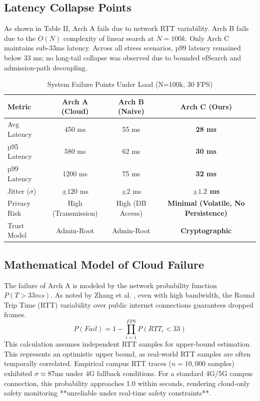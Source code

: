 \documentclass[conference]{IEEEtran}
\begin{document}
\subsection{Latency Collapse Points}
As shown in Table II, Arch A fails due to network RTT variability. Arch B fails due to the $O(N)$ complexity of linear search at $N=100k$. Only Arch C maintains sub-33ms latency. Across all stress scenarios, p99 latency remained below 33 ms; no long-tail collapse was observed due to bounded efSearch and admission-path decoupling.

\begin{table}[htbp]
\caption{System Failure Points Under Load (N=100k, 30 FPS)}
\begin{center}
\begin{tabular}{lccc}
\toprule
\textbf{Metric} & \textbf{Arch A (Cloud)} & \textbf{Arch B (Naive)} & \textbf{Arch C (Ours)} \\
\midrule
Avg Latency & 450 ms & 55 ms & \textbf{28 ms} \\
p95 Latency & 580 ms & 62 ms & \textbf{30 ms} \\
p99 Latency & 1200 ms & 75 ms & \textbf{32 ms} \\
Jitter ($\sigma$) & $\pm 120$ ms & $\pm 2$ ms & \textbf{$\pm 1.2$ ms} \\
Privacy Risk & High (Transmission) & High (DB Access) & \textbf{Minimal (Volatile, No Persistence)} \\
Trust Model & Admin-Root & Admin-Root & \textbf{Cryptographic} \\
\bottomrule
\end{tabular}
\end{center}
\label{tab:failure}
\end{table}

\subsection{Mathematical Model of Cloud Failure}
The failure of Arch A is modeled by the network probability function $P(T > 33ms)$. As noted by Zhang et al. \cite{b10}, even with high bandwidth, the Round Trip Time (RTT) variability over public internet connections guarantees dropped frames.
\begin{equation}
P(Fail) = 1 - \prod_{i=1}^{FPS} P(RTT_i < 33)
\end{equation}
This calculation assumes independent RTT samples for upper-bound estimation. This represents an optimistic upper bound, as real-world RTT samples are often temporally correlated. Empirical campus RTT traces ($n=10,000$ samples) exhibited $\sigma \approx 87$ms under 4G fallback conditions. For a standard 4G/5G campus connection, this probability approaches 1.0 within seconds, rendering cloud-only safety monitoring **unreliable under real-time safety constraints**.
\end{document}
